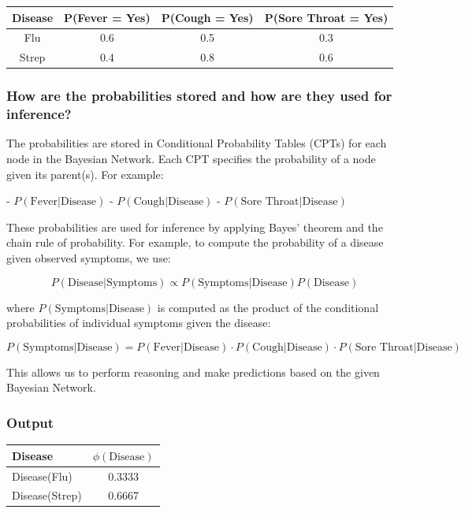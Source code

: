 \documentclass{article}
\begin{document}
\begin{table}[H]
\centering
\begin{tabular}{|c|c|c|c|}
\hline
\textbf{Disease} & \textbf{P(Fever = Yes)} & \textbf{P(Cough = Yes)} & \textbf{P(Sore Throat = Yes)} \\ \hline
Flu              & 0.6                     & 0.5                     & 0.3                          \\ \hline
Strep            & 0.4                     & 0.8                     & 0.6                          \\ \hline
\end{tabular}
\end{table}

\subsubsection*{How are the probabilities stored and how are they used for inference?}
The probabilities are stored in Conditional Probability Tables (CPTs) for each node in the Bayesian Network. 
Each CPT specifies the probability of a node given its parent(s). For example:

- \( P(\text{Fever} | \text{Disease}) \)
- \( P(\text{Cough} | \text{Disease}) \)
- \( P(\text{Sore Throat} | \text{Disease}) \)

These probabilities are used for inference by applying Bayes' theorem and the chain rule of probability.
 For example, to compute the probability of a disease given observed symptoms, we use:

\[
P(\text{Disease} | \text{Symptoms}) \propto P(\text{Symptoms} | \text{Disease}) P(\text{Disease})
\]

where \( P(\text{Symptoms} | \text{Disease}) \) is computed as the product of the conditional probabilities of individual symptoms given the disease:

\[
P(\text{Symptoms} | \text{Disease}) = P(\text{Fever} | \text{Disease}) \cdot P(\text{Cough} | \text{Disease}) \cdot P(\text{Sore Throat} | \text{Disease})
\]

This allows us to perform reasoning and make predictions based on the given Bayesian Network.

\subsubsection*{Output}
\begin{table}[H]
\centering
\begin{tabular}{|l|c|}
\hline
\textbf{Disease}        & \(\phi(\text{Disease})\) \\ \hline
Disease(Flu)            & 0.3333                   \\ \hline
Disease(Strep)          & 0.6667                   \\ \hline
\end{tabular}
\end{table}
\clearpage
\end{document}
